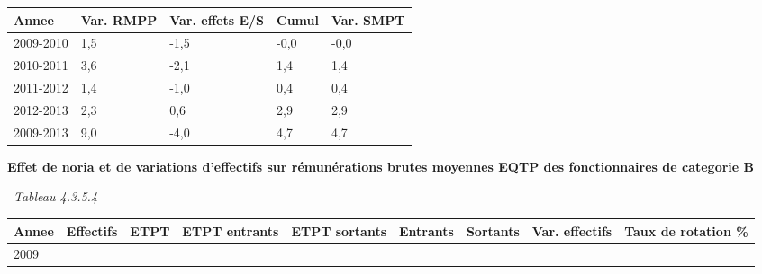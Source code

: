 \begin{longtable}[]{@{}lllll@{}}
\toprule
Annee & Var. RMPP & Var. effets E/S & Cumul & Var. SMPT\tabularnewline
\midrule
\endhead
2009-2010 & 1,5 & -1,5 & -0,0 & -0,0\tabularnewline
2010-2011 & 3,6 & -2,1 & 1,4 & 1,4\tabularnewline
2011-2012 & 1,4 & -1,0 & 0,4 & 0,4\tabularnewline
2012-2013 & 2,3 & 0,6 & 2,9 & 2,9\tabularnewline
2009-2013 & 9,0 & -4,0 & 4,7 & 4,7\tabularnewline
\bottomrule
\end{longtable}

\textbf{Effet de noria et de variations d'effectifs sur rémunérations
brutes moyennes EQTP des fonctionnaires de categorie B}

~\emph{Tableau 4.3.5.4}

\begin{longtable}[]{@{}lllllllll@{}}
\toprule
\begin{minipage}[b]{0.05\columnwidth}\raggedright
Annee\strut
\end{minipage} & \begin{minipage}[b]{0.08\columnwidth}\raggedright
Effectifs\strut
\end{minipage} & \begin{minipage}[b]{0.04\columnwidth}\raggedright
ETPT\strut
\end{minipage} & \begin{minipage}[b]{0.10\columnwidth}\raggedright
ETPT entrants\strut
\end{minipage} & \begin{minipage}[b]{0.10\columnwidth}\raggedright
ETPT sortants\strut
\end{minipage} & \begin{minipage}[b]{0.07\columnwidth}\raggedright
Entrants\strut
\end{minipage} & \begin{minipage}[b]{0.07\columnwidth}\raggedright
Sortants\strut
\end{minipage} & \begin{minipage}[b]{0.11\columnwidth}\raggedright
Var. effectifs\strut
\end{minipage} & \begin{minipage}[b]{0.14\columnwidth}\raggedright
Taux de rotation \%\strut
\end{minipage}\tabularnewline
\midrule
\endhead
\begin{minipage}[t]{0.05\columnwidth}\raggedright
2009\strut
\end{minipage} & \begin{minipage}[t]{0.08\columnwidth}\raggedright

\end{minipage}
\end{longtable}
